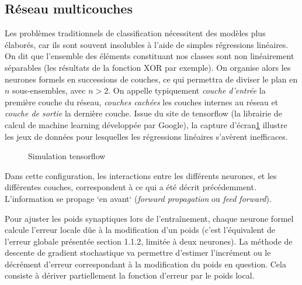     \subsection{Réseau multicouches}

      Les problèmes traditionnels de classification nécessitent des modèles plus élaborés, car ils sont souvent insolubles à l'aide de simples régressions linéaires. On dit que l'ensemble des éléments constituant nos classes
      sont non linéairement séparables (les résultats de la fonction XOR par exemple). On organise alors les neurones formels en successions de couches, ce qui permettra de diviser le plan en $n$ sous-ensembles, avec $n >2$.
      On appelle typiquement \textit{couche d'entrée} la première couche du réseau, \textit{couches cachées} les couches internes au réseau et \textit{couche de sortie} la dernière couche.
      Issue du site de tensorflow\cite{Bib_PlaygroundTF} (la librairie de calcul de machine learning développée par Google\cite{Bib_TenFlo}), la capture d'écran\ref{fig:c1p2s2} illustre les jeux de données pour lesquelles les régressions linéaires s'avèrent inefficaces.

      \begin{figure}[H]
	  \centering
	  \caption{Simulation tensorflow}
	  \label{fig:c1p2s2}
      \end{figure}


      Dans cette configuration, les interactions entre les différents neurones, et les différentes couches, correspondent à ce qui a été décrit précédemment. L'information se propage `en avant` (\textit{forward propagation} ou \textit{feed forward}).
      \par
      Pour ajuster les poids synaptiques lors de l'entraînement, chaque neurone formel calcule l'erreur locale dûe à la modification d'un poids (c'est l'équivalent de l'erreur globale présentée section 1.1.2, limitée à deux neurones).
      La méthode de descente de gradient stochastique\cite{Bib_WikiSGD} va permettre d'estimer l'incrément ou le décrément d'erreur correspondant à la modification du poids en question. Cela consiste à dériver partiellement la fonction d'erreur par le poids local.

